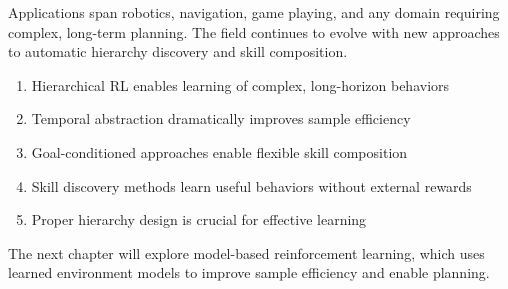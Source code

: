 Applications span robotics, navigation, game playing, and any domain requiring complex, long-term planning. The field continues to evolve with new approaches to automatic hierarchy discovery and skill composition.

\begin{keyideabox}
\begin{enumerate}
    \item Hierarchical RL enables learning of complex, long-horizon behaviors
    \item Temporal abstraction dramatically improves sample efficiency
    \item Goal-conditioned approaches enable flexible skill composition
    \item Skill discovery methods learn useful behaviors without external rewards
    \item Proper hierarchy design is crucial for effective learning
\end{enumerate}
\end{keyideabox}

The next chapter will explore model-based reinforcement learning, which uses learned environment models to improve sample efficiency and enable planning.